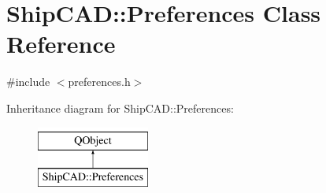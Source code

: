 \hypertarget{classShipCAD_1_1Preferences}{\section{Ship\-C\-A\-D\-:\-:Preferences Class Reference}
\label{classShipCAD_1_1Preferences}
}


{\ttfamily \#include $<$preferences.\-h$>$}

Inheritance diagram for Ship\-C\-A\-D\-:\-:Preferences\-:\begin{figure}[H]
\begin{center}
\leavevmode
\includegraphics[height=2.000000cm]{classShipCAD_1_1Preferences}
\end{center}
\end{figure}
